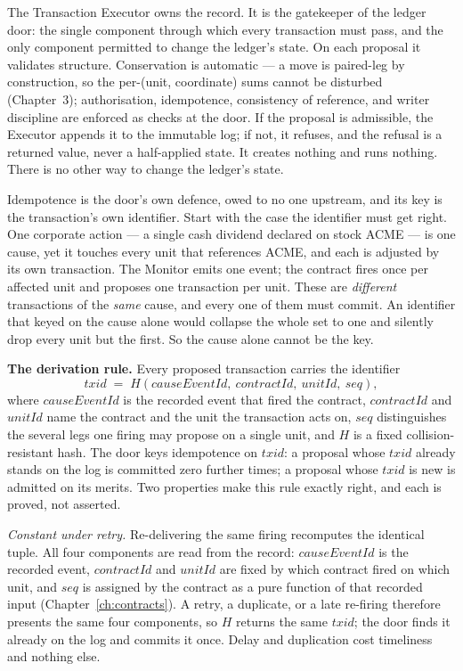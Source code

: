 \documentclass[11pt,a4paper]{article}
\begin{document}
The Transaction Executor owns the record. It is the gatekeeper of the ledger
door: the single component through which every transaction must pass, and the
only component permitted to change the ledger's state. On each proposal it
validates structure. Conservation is automatic --- a move is paired-leg by
construction, so the per-(unit, coordinate) sums cannot be disturbed
(Chapter~3); authorisation, idempotence, consistency of reference, and writer
discipline are enforced as checks at the door. If the proposal is admissible,
the Executor appends it to the immutable log; if not, it refuses, and the
refusal is a returned value, never a half-applied state. It creates nothing and
runs nothing. There is no other way to change the ledger's state.

Idempotence is the door's own defence, owed to no one upstream, and its key is the
transaction's own identifier. Start with the case the identifier must get right. One
corporate action --- a single cash dividend declared on stock ACME --- is one cause,
yet it touches every unit that references ACME, and each is adjusted by its own
transaction. The Monitor emits one event; the contract fires once per affected unit
and proposes one transaction per unit. These are \emph{different} transactions of the
\emph{same} cause, and every one of them must commit. An identifier that keyed on the
cause alone would collapse the whole set to one and silently drop every unit but the
first. So the cause alone cannot be the key.

\textbf{The derivation rule.} Every proposed transaction carries the identifier
\[
  \mathit{txid} \;=\; H(\mathit{causeEventId},\ \mathit{contractId},\ \mathit{unitId},\ \mathit{seq}),
\]
where $\mathit{causeEventId}$ is the recorded event that fired the contract,
$\mathit{contractId}$ and $\mathit{unitId}$ name the contract and the unit the
transaction acts on, $\mathit{seq}$ distinguishes the several legs one firing may
propose on a single unit, and $H$ is a fixed collision-resistant hash. The door keys
idempotence on $\mathit{txid}$: a proposal whose $\mathit{txid}$ already stands on the
log is committed zero further times; a proposal whose $\mathit{txid}$ is new is
admitted on its merits. Two properties make this rule exactly right, and each is
proved, not asserted.

\emph{Constant under retry.} Re-delivering the same firing recomputes the identical
tuple. All four components are read from the record: $\mathit{causeEventId}$ is the
recorded event, $\mathit{contractId}$ and $\mathit{unitId}$ are fixed by which
contract fired on which unit, and $\mathit{seq}$ is assigned by the contract as a pure
function of that recorded input (Chapter~\ref{ch:contracts}). A retry, a duplicate, or
a late re-firing therefore presents the same four components, so $H$ returns the same
$\mathit{txid}$; the door finds it already on the log and commits it once. Delay and
duplication cost timeliness and nothing else.
\end{document}
